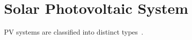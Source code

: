 \documentclass[review]{elsarticle}
\begin{document}
\section{Solar Photovoltaic System }
\label{sec:SolarPhotovoltaicSystem}
%
%
PV systems are classified into distinct types~\citep{Mohanty}. %
%
\end{document}
